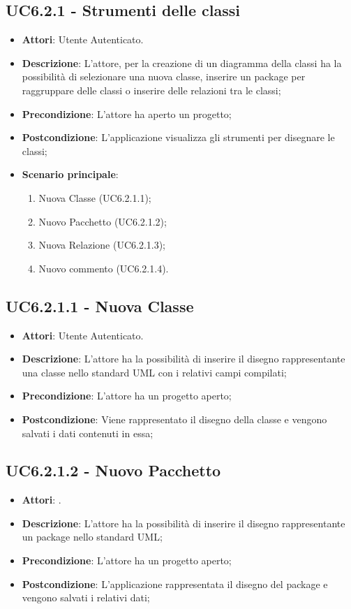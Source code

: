 \subsection{UC6.2.1 - Strumenti delle classi} 
\label{ssec:UC6.2.1} 
\begin{itemize} 
\item \textbf{Attori}: Utente Autenticato.
\item \textbf{Descrizione}: L'attore, per la creazione di un diagramma della classi ha la possibilità di selezionare una nuova classe, inserire un package per raggruppare delle classi o inserire delle relazioni tra le classi;
\item \textbf{Precondizione}: L'attore ha aperto un progetto;
\item \textbf{Postcondizione}: L'applicazione visualizza gli strumenti per disegnare le classi;
\item \textbf{Scenario principale}: \begin{enumerate}\item Nuova Classe (UC6.2.1.1);\item Nuovo Pacchetto (UC6.2.1.2);\item Nuova Relazione (UC6.2.1.3);\item Nuovo commento (UC6.2.1.4). 
 \end{enumerate}
\end{itemize} 
\subsection{UC6.2.1.1 - Nuova Classe} 
\label{ssec:UC6.2.1.1} 
\begin{itemize} 
\item \textbf{Attori}: Utente Autenticato.
\item \textbf{Descrizione}: L'attore ha la possibilità di inserire il disegno rappresentante una classe nello standard UML con i relativi campi compilati;
\item \textbf{Precondizione}: L'attore ha un progetto aperto;
\item \textbf{Postcondizione}: Viene rappresentato il disegno della classe e vengono salvati i dati contenuti in essa;
\end{itemize} 
\subsection{UC6.2.1.2 - Nuovo Pacchetto} 
\label{ssec:UC6.2.1.2} 
\begin{itemize} 
\item \textbf{Attori}: .
\item \textbf{Descrizione}: L'attore ha la possibilità di inserire il disegno rappresentante un package nello standard UML;
\item \textbf{Precondizione}: L'attore ha un progetto aperto;
\item \textbf{Postcondizione}: L'applicazione rappresentata il disegno del package e vengono salvati i relativi dati;
\end{itemize} 
